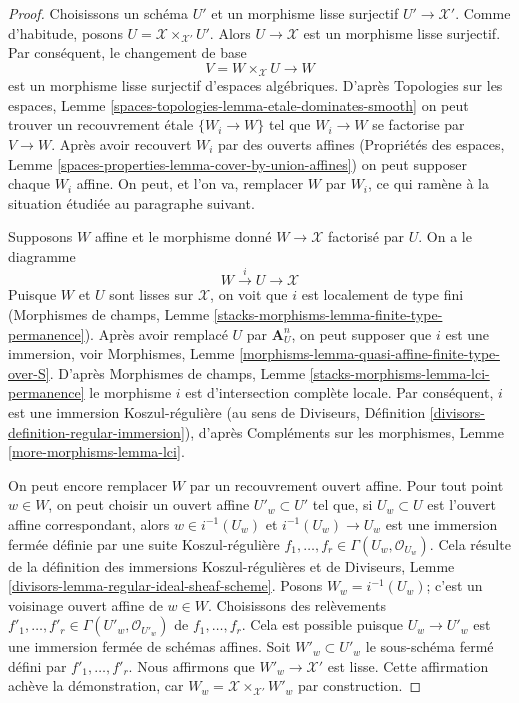\begin{proof}
Choisissons un schéma $U'$ et un morphisme lisse surjectif $U' \to \mathcal{X}'$.
Comme d'habitude, posons $U = \mathcal{X} \times_{\mathcal{X}'} U'$. Alors
$U \to \mathcal{X}$ est un morphisme lisse surjectif. Par conséquent, le changement de base
$$
V = W \times_{\mathcal{X}} U \longrightarrow W
$$
est un morphisme lisse surjectif d'espaces algébriques.
D'après Topologies sur les espaces, Lemme
\ref{spaces-topologies-lemma-etale-dominates-smooth}
on peut trouver un recouvrement \'etale $\{W_i \to W\}$ tel
que $W_i \to W$ se factorise par $V \to W$.
Après avoir recouvert $W_i$ par des ouverts affines (Propriétés des espaces, Lemme
\ref{spaces-properties-lemma-cover-by-union-affines})
on peut supposer chaque $W_i$ affine. On peut, et l'on va, remplacer $W$ par $W_i$,
ce qui ramène à la situation étudiée au paragraphe suivant.

\medskip\noindent
Supposons $W$ affine et le morphisme donné $W \to \mathcal{X}$ factorisé
par $U$. On a le diagramme
$$
W \xrightarrow{i} U \to \mathcal{X}
$$
Puisque $W$ et $U$ sont lisses sur $\mathcal{X}$, on voit que
$i$ est localement de type fini (Morphismes de champs, Lemme
\ref{stacks-morphisms-lemma-finite-type-permanence}).
Après avoir remplacé $U$ par $\mathbf{A}^n_U$, on peut supposer
que $i$ est une immersion, voir
Morphismes, Lemme \ref{morphisms-lemma-quasi-affine-finite-type-over-S}.
D'après Morphismes de champs,
Lemme \ref{stacks-morphisms-lemma-lci-permanence}
le morphisme $i$ est d'intersection complète locale.
Par conséquent, $i$ est une immersion Koszul-régulière (au sens de
Diviseurs, Définition \ref{divisors-definition-regular-immersion}),
d'après Compléments sur les morphismes, Lemme \ref{more-morphisms-lemma-lci}.

\medskip\noindent
On peut encore remplacer $W$ par un recouvrement ouvert affine.
Pour tout point $w \in W$, on peut choisir un ouvert affine
$U'_w \subset U'$ tel que, si $U_w \subset U$ est
l'ouvert affine correspondant, alors $w \in i^{-1}(U_w)$ et
$i^{-1}(U_w) \to U_w$ est une immersion fermée définie
par une suite Koszul-régulière
$f_1, \ldots, f_r \in \Gamma(U_w, \mathcal{O}_{U_w})$.
Cela résulte de la définition des immersions Koszul-régulières
et de Diviseurs, Lemme \ref{divisors-lemma-regular-ideal-sheaf-scheme}.
Posons $W_w = i^{-1}(U_w)$; c'est un voisinage ouvert affine
de $w \in W$.
Choisissons des relèvements $f'_1, \ldots, f'_r \in \Gamma(U'_w, \mathcal{O}_{U'_w})$
de $f_1, \ldots, f_r$. Cela est possible puisque $U_w \to U'_w$
est une immersion fermée de schémas affines.
Soit $W'_w \subset U'_w$ le sous-schéma fermé défini par
$f'_1, \ldots, f'_r$.
Nous affirmons que $W'_w \to \mathcal{X}'$ est lisse.
Cette affirmation achève la démonstration, car
$W_w = \mathcal{X} \times_{\mathcal{X}'} W'_w$
par construction.


\end{proof}
